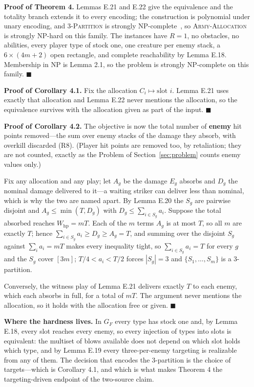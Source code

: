\documentclass[11pt,a4paper]{article}
\theoremstyle{plain}
\theoremstyle{definition}
\theoremstyle{plain}
\theoremstyle{definition}
\theoremstyle{remark}
\newcommand{\ALLOC}{\textsc{Army-Allocation}}
\newcommand{\THREEPART}{\textsc{3-Partition}}
\newcommand{\qedbox}{\hfill$\blacksquare$}
\begin{document}
\smallskip
\noindent\textbf{Proof of Theorem 4.} Lemmas E.21 and E.22 give the equivalence and the
totality branch extends it to every encoding; the construction is polynomial under unary
encoding, and \THREEPART{} is strongly NP-complete~\cite{GJ79}, so \ALLOC{} is strongly
NP-hard on this family. The instances have $R=1$, no obstacles, no abilities, every player
type of stock one, one creature per enemy stack, a $6\times(4m+2)$ open rectangle, and
complete reachability by Lemma E.18. Membership in NP is Lemma 2.1, so the problem is strongly
NP-complete on this family. \qedbox

\smallskip
\noindent\textbf{Proof of Corollary 4.1.} Fix the allocation $C_i\mapsto\text{slot } i$.
Lemma E.21 uses exactly that allocation and Lemma E.22 never mentions the allocation, so the
equivalence survives with the allocation given as part of the input. \qedbox

\smallskip
\noindent\textbf{Proof of Corollary 4.2.} The objective is now the total number of
\textbf{enemy} hit points removed---the sum over enemy stacks of the damage they absorb, with
overkill discarded (R8). (Player hit points are removed too, by retaliation; they are not
counted, exactly as the Problem of Section~\ref{sec:problem} counts enemy values only.)

Fix any allocation and any play; let $A_g$ be the damage $E_g$ absorbs and $D_g$ the nominal
damage delivered to it---a waiting striker can deliver less than nominal, which is why the
two are named apart. By Lemma E.20 the $S_g$ are pairwise disjoint and
$A_g\le\min(T,D_g)$ with $D_g\le\sum_{i\in S_g}a_i$. Suppose the total absorbed reaches
$W_{\mathrm{hp}}=mT$. Each of the $m$ terms
$A_g$ is at most $T$, so all $m$ are exactly $T$; hence
$\sum_{i\in S_g}a_i\ge D_g\ge A_g=T$, and summing over the disjoint $S_g$ against
$\sum_i a_i=mT$ makes every inequality tight, so $\sum_{i\in S_g}a_i=T$ for every $g$ and the
$S_g$ cover $[3m]$; $T/4<a_i<T/2$ forces $|S_g|=3$ and $\{S_1,\dots,S_m\}$ is a 3-partition.

Conversely, the witness play of Lemma E.21 delivers exactly $T$ to each enemy, which each
absorbs in full, for a total of $mT$. The argument never mentions the allocation, so it holds
with the allocation free or given. \qedbox

\smallskip
\noindent\textbf{Where the hardness lives.} In $G_F$ every type has stock one and, by
Lemma E.18, every slot reaches every enemy, so every injection of types into slots is
equivalent: the multiset of blows available does not depend on which slot holds which type,
and by Lemma E.19 every three-per-enemy targeting is realizable from any of them. The decision
that encodes the 3-partition is the choice of targets---which is Corollary 4.1, and which is
what makes Theorem 4 the targeting-driven endpoint of the two-source claim.
\end{document}

